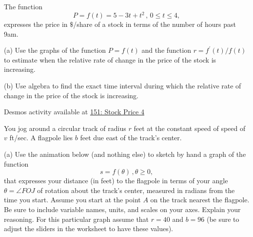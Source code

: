 \documentclass{ximera}
\begin{document}
\begin{question}  \label{Q:dfgt4tnhy}
The function 
\[
      P = f(t) = 5 -3t + t^2 \, , \, 0\leq t \leq 4 , 
\]
expresses the price in $\$$/share of a stock in terms of the number of hours past 9am.

(a) Use the graphs of the function $P=f(t)$ and the function $r=f^\prime(t)/f(t)$  to estimate when the relative rate of change in the price of the stock is increasing.

(b) Use algebra to find the exact time interval during which the relative rate of change in the price of the stock is increasing.

\begin{onlineOnly}
    \begin{center}
\end{center}
\end{onlineOnly}

Desmos activity available at \href{https://www.desmos.com/calculator/xuupp3srqv}{151: Stock Price 4}

\end{question}


\begin{question}  \label{Qdgvbjuhjyhu}
You jog around a circular track of radius $r$ feet at the constant speed of speed of $v$ ft/sec. A flagpole lies $b$ feet due east of the track's center.

(a) Use the animation below (and nothing else) to sketch by hand a graph of the function 
\[
   s = f(\theta) \, , \theta \geq 0,
\]
that expresses your distance (in feet) to the flagpole in terms of your angle $\theta = \angle FOJ$ of rotation about the track's center, measured in radians from the time you start. Assume you start at the point $A$ on the track nearest the flagpole. Be sure to include variable names, units, and scales on your axes. Explain your reasoning. For this particular graph assume that $r=40$ and $b=96$ (be sure to adjust the sliders in the worksheet to have these values).

\begin{onlineOnly}
    \begin{center}
\end{center}
\end{onlineOnly}


\end{question}
\end{document}
